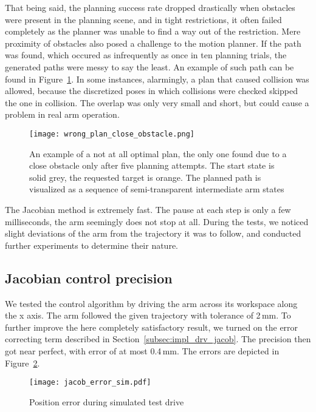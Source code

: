 \documentclass[buriama8_dp.tex]{subfiles}
\begin{document}
That being said, the planning success rate dropped drastically when obstacles were present in the planning scene, and in tight restrictions, it often failed completely as the planner was unable to find a way out of the restriction. Mere proximity of obstacles also posed a challenge to the motion planner. If the path was found, which occured as infrequently as once in ten planning trials, the generated paths were messy to say the least. An example of such path can be found in Figure~\ref{fig:collision_plan}. In some instances, alarmingly, a plan that caused collision was allowed, because the discretized poses in which collisions were checked skipped the one in collision. The overlap was only very small and short, but could cause a problem in real arm operation.

\begin{figure}[htp]
  \centering
  \texttt{[image: wrong\_plan\_close\_obstacle.png]}
  \caption[Obstacle avoiding motion plan]{An example of a not at all optimal plan, the only one found due to a close obstacle only after five planning attempts. The start state is solid grey, the requested target is orange. The planned path is visualized as a sequence of semi-transparent intermediate arm states}
  \label{fig:collision_plan}
\end{figure}


The Jacobian method is extremely fast. The pause at each step is only a few milliseconds, the arm seemingly does not stop at all.  During the tests, we noticed slight deviations of the arm from the trajectory it was to follow, and conducted further experiments to determine their nature.

\subsection{Jacobian control precision}
\label{subsec:label}


We tested the control algorithm by driving the arm across its workspace along the \m x axis. The arm followed the given trajectory with tolerance of 2\,mm. To further improve the here completely satisfactory result, we turned on the error correcting term described in Section~\ref{subsec:impl_drv_jacob}. The precision then got near perfect, with error of at most 0.4\,mm. The errors are depicted in Figure~\ref{fig:err_jac_sim}. 

\begin{figure}[ht]
  \centering
  \texttt{[image: jacob\_error\_sim.pdf]}
  \caption{Position error during simulated test drive}
  \label{fig:err_jac_sim}
\end{figure}
\end{document}
